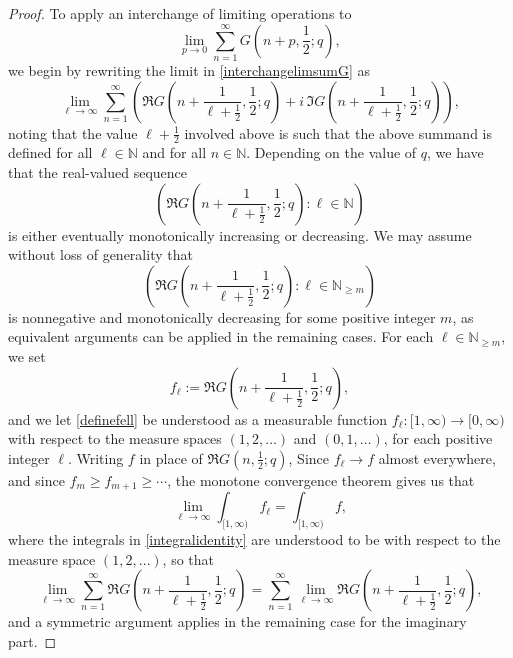 \documentclass[12pt]{article}
\begin{document}
\begin{proof}
 To apply an interchange of limiting operations to
\begin{equation}\label{interchangelimsumG}
 \lim_{p \to 0} \sum_{n=1}^{\infty} G\left( n + p, \frac{1}{2}; q \right), 
\end{equation}
 we begin by rewriting the limit in \eqref{interchangelimsumG} as 
\begin{equation*}
 \lim_{\ell \to \infty} \sum_{n=1}^{\infty} \left( \Re G\left( n + \frac{1}{\ell+\frac{1}{2}}, \frac{1}{2}; q \right) 
 + i \, \Im G\left( n + \frac{1}{\ell+\frac{1}{2}}, \frac{1}{2}; q \right) \right), 
\end{equation*}
 noting that the value $\ell + \frac{1}{2}$ involved above
 is such that the above summand is defined for 
 all $\ell \in \mathbb{N}$ and for all $n \in \mathbb{N}$. 
 Depending on the value of $q$, we have that the real-valued sequence 
\begin{equation*}
 \left( \Re G\left( n + \frac{1}{\ell+\frac{1}{2}}, \frac{1}{2}; q \right) : \ell \in \mathbb{N} \right) 
\end{equation*}
 is either eventually monotonically increasing or decreasing. 
 We may assume without loss of generality that 
\begin{equation}\label{202509061014AMqqq2A}
 \left( \Re G\left( n + \frac{1}{\ell+\frac{1}{2}}, \frac{1}{2}; q \right) : \ell \in \mathbb{N}_{\geq m} 
 \right) 
\end{equation}
 is nonnegative and monotonically decreasing for some positive integer $m$, 
 as equivalent arguments can be applied in the remaining
 cases. For each $\ell \in \mathbb{N}_{\geq m}$, we set 
\begin{equation}\label{definefell}
 f_{\ell} := \Re G\left( n + \frac{1}{\ell+\frac{1}{2}}, \frac{1}{2}; q \right), 
\end{equation}
 and we let \eqref{definefell} 
 be understood as a measurable function $f_{\ell}\colon [1, \infty) \to [0, \infty)$
 with respect to the measure spaces $(1, 2, \ldots)$ and $(0, 1, \ldots)$, 
 for each positive integer $\ell$. Writing $f$ in place of 
 $ \Re G\left( n, \frac{1}{2}; q \right)$, Since 
 $f_{\ell} \to f$ almost everywhere, and since 
 $f_{m} \geq f_{m+1} \geq \cdots$, the monotone convergence theorem gives us that 
\begin{equation}\label{integralidentity}
 \lim_{\ell \to \infty} \int_{[1, \infty)} f_{\ell} = \int_{[1, \infty)} f, 
\end{equation}
 where the integrals in \eqref{integralidentity}
 are understood to be with respect to the measure space $(1, 2, \ldots)$, so that 
 $$ \lim_{\ell \to \infty} \sum_{n=1}^{\infty} \Re G\left( n + \frac{1}{\ell+\frac{1}{2}}, \frac{1}{2}; q \right) 
 = \sum_{n=1}^{\infty} \lim_{\ell \to \infty} \Re G\left( n + \frac{1}{\ell+\frac{1}{2}}, \frac{1}{2}; q \right), $$
 and a symmetric argument applies in the remaining case for the imaginary part. 


\end{proof}
\end{document}
